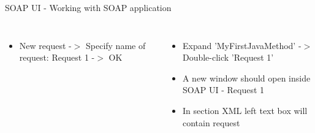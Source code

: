 \documentclass[aspectratio=1610,english]{beamer} %
\begin{document}
\begin{frame}{SOAP UI - Working with SOAP application}
\begin{columns}
				\begin{itemize}
					\tiny
					\color{black}
					\item New request -$>$ Specify name of request: Request 1 -$>$ OK
				\end{itemize}
				\begin{minipage}{\textwidth}
				\end{minipage}				
				
				\begin{itemize}
					\tiny
					\color{black}
					\item Expand 'MyFirstJavaMethod' -$>$ Double-click 'Request 1'
					\item A new window should open inside SOAP UI - Request 1
					\item In section XML left text box will contain request
				\end{itemize}
				\begin{minipage}{\textwidth}
				\end{minipage}
				

\end{columns}
\end{frame}
\end{document}
